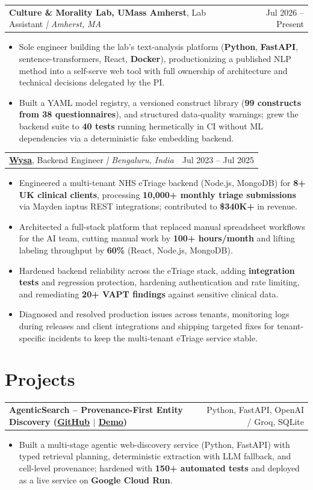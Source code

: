 \documentclass[letterpaper,11pt]{article}
\makeatletter
\newcommand{\expItem}[4]{%
  \vspace{2pt}
  \begin{tabular*}{\textwidth}{@{}l@{\extracolsep{\fill}}r@{}}
    \textbf{#1}, #2 \textit{| #3} & #4 \\
  \end{tabular*}\par\vspace{-3pt}
}
\newcommand{\projItem}[2]{%
  \vspace{2pt}
  \begin{tabular*}{\textwidth}{@{}l@{\extracolsep{\fill}}r@{}}
    \textbf{#1} & #2 \\
  \end{tabular*}\par\vspace{-3pt}
}
\makeatother
\begin{document}
\expItem{Culture \& Morality Lab, UMass Amherst}{Lab Assistant}{Amherst, MA}{Jul 2026 -- Present}
\begin{itemize}
  \item Sole engineer building the lab's text-analysis platform (\textbf{Python}, \textbf{FastAPI}, sentence-transformers, React, \textbf{Docker}), productionizing a published NLP method into a self-serve web tool with full ownership of architecture and technical decisions delegated by the PI.
  \item Built a YAML model registry, a versioned construct library (\textbf{99 constructs from 38 questionnaires}), and structured data-quality warnings; grew the backend suite to \textbf{40 tests} running hermetically in CI without ML dependencies via a deterministic fake embedding backend.
\end{itemize}

\expItem{\href{https://www.wysa.io}{Wysa}}{Backend Engineer}{Bengaluru, India}{Jul 2023 -- Jul 2025}
\begin{itemize}
  \item Engineered a multi-tenant NHS eTriage backend (Node.js, MongoDB) for \textbf{8+ UK clinical clients}, processing \textbf{10{,}000+ monthly triage submissions} via Mayden iaptus REST integrations; contributed to \textbf{\$340K+} in revenue.
  \item Architected a full-stack platform that replaced manual spreadsheet workflows for the AI team, cutting manual work by \textbf{100+ hours/month} and lifting labeling throughput by \textbf{60\%} (React, Node.js, MongoDB).
  \item Hardened backend reliability across the eTriage stack, adding \textbf{integration tests} and regression protection, hardening authentication and rate limiting, and remediating \textbf{20+ VAPT findings} against sensitive clinical data.
  \item Diagnosed and resolved production issues across tenants, monitoring logs during releases and client integrations and shipping targeted fixes for tenant-specific incidents to keep the multi-tenant eTriage service stable.
\end{itemize}

\section{Projects}

\projItem{AgenticSearch -- Provenance-First Entity Discovery {\normalfont\small(\href{https://github.com/Deva-1903/ciir_agentic_search}{GitHub} $\vert$ \href{https://agentic-search-negglszkwa-uc.a.run.app}{Demo})}}{Python, FastAPI, OpenAI / Groq, SQLite}
\begin{itemize}
  \item Built a multi-stage agentic web-discovery service (Python, FastAPI) with typed retrieval planning, deterministic extraction with LLM fallback, and cell-level provenance; hardened with \textbf{150+ automated tests} and deployed as a live service on \textbf{Google Cloud Run}.
\end{itemize}
\end{document}
